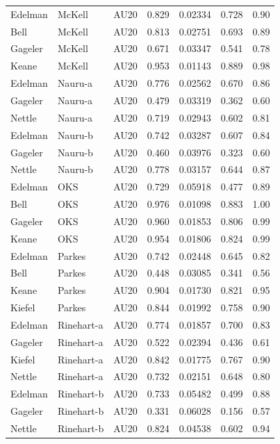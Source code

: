 \documentclass{monashthesis}
\begin{document}
\begin{center}
\begin{longtable}{lllllll}
Edelman & McKell & AU20 & 0.829 & 0.02334 & 0.728 & 0.90 \\
Bell & McKell & AU20 & 0.813 & 0.02751 & 0.693 & 0.89 \\
Gageler & McKell & AU20 & 0.671 & 0.03347 & 0.541 & 0.78 \\
Keane & McKell & AU20 & 0.953 & 0.01143 & 0.889 & 0.98 \\
Edelman & Nauru-a & AU20 & 0.776 & 0.02562 & 0.670 & 0.86 \\
Gageler & Nauru-a & AU20 & 0.479 & 0.03319 & 0.362 & 0.60 \\
Nettle & Nauru-a & AU20 & 0.719 & 0.02943 & 0.602 & 0.81 \\
Edelman & Nauru-b & AU20 & 0.742 & 0.03287 & 0.607 & 0.84 \\
Gageler & Nauru-b & AU20 & 0.460 & 0.03976 & 0.323 & 0.60 \\
Nettle & Nauru-b & AU20 & 0.778 & 0.03157 & 0.644 & 0.87 \\
Edelman & OKS & AU20 & 0.729 & 0.05918 & 0.477 & 0.89 \\
Bell & OKS & AU20 & 0.976 & 0.01098 & 0.883 & 1.00 \\
Gageler & OKS & AU20 & 0.960 & 0.01853 & 0.806 & 0.99 \\
Keane & OKS & AU20 & 0.954 & 0.01806 & 0.824 & 0.99 \\
Edelman & Parkes & AU20 & 0.742 & 0.02448 & 0.645 & 0.82 \\
Bell & Parkes & AU20 & 0.448 & 0.03085 & 0.341 & 0.56 \\
Keane & Parkes & AU20 & 0.904 & 0.01730 & 0.821 & 0.95 \\
Kiefel & Parkes & AU20 & 0.844 & 0.01992 & 0.758 & 0.90 \\
Edelman & Rinehart-a & AU20 & 0.774 & 0.01857 & 0.700 & 0.83 \\
Gageler & Rinehart-a & AU20 & 0.522 & 0.02394 & 0.436 & 0.61 \\
Kiefel & Rinehart-a & AU20 & 0.842 & 0.01775 & 0.767 & 0.90 \\
Nettle & Rinehart-a & AU20 & 0.732 & 0.02151 & 0.648 & 0.80 \\
Edelman & Rinehart-b & AU20 & 0.733 & 0.05482 & 0.499 & 0.88 \\
Gageler & Rinehart-b & AU20 & 0.331 & 0.06028 & 0.156 & 0.57 \\
Nettle & Rinehart-b & AU20 & 0.824 & 0.04538 & 0.602 & 0.94 \\
\end{longtable}
\end{center}
\end{document}
